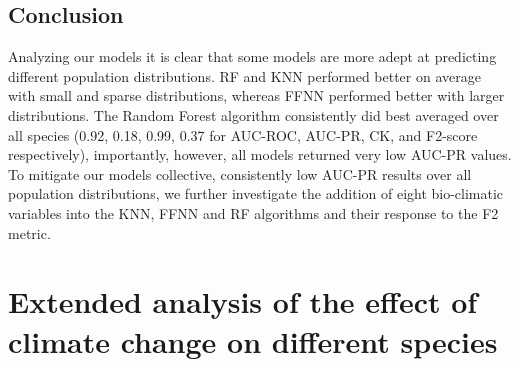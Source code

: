 

\subsection{Conclusion}

Analyzing our models it is clear that some models are more adept at predicting different population distributions. RF and KNN performed better on average with small and sparse distributions, whereas FFNN performed better with larger distributions.
The Random Forest algorithm consistently did best averaged over all species (0.92, 0.18, 0.99, 0.37 for AUC-ROC, AUC-PR, CK, and F2-score respectively), importantly, however, all models returned very low AUC-PR values. To mitigate our models collective, consistently low AUC-PR results over all population distributions, we further investigate the addition of eight bio-climatic variables into the KNN, FFNN and RF algorithms and their response to the F2 metric.


\section{Extended analysis of the effect of climate change on different species}

